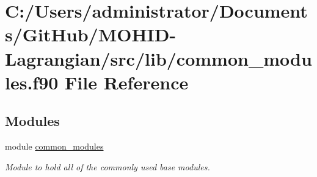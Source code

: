 \hypertarget{common__modules_8f90}{}\section{C\+:/\+Users/administrator/\+Documents/\+Git\+Hub/\+M\+O\+H\+I\+D-\/\+Lagrangian/src/lib/common\+\_\+modules.f90 File Reference}
\label{common__modules_8f90}
\subsection*{Modules}
\begin{DoxyCompactItemize}
\item 
module \mbox{\hyperlink{namespacecommon__modules}{common\+\_\+modules}}
\begin{DoxyCompactList}\small\item\em Module to hold all of the commonly used base modules. \end{DoxyCompactList}\end{DoxyCompactItemize}
